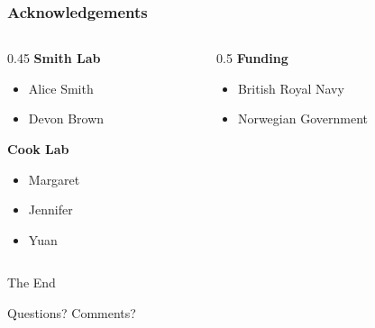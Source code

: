 \documentclass[
	11pt, %
	aspectratio=169, %
]{beamer}
\begin{document}

\begin{frame}
	\frametitle{Acknowledgements}
	
	\begin{columns}[t] %
		\begin{column}{0.45\textwidth} %
			\textbf{Smith Lab}
			\begin{itemize}
				\item Alice Smith
				\item Devon Brown
			\end{itemize}
			\textbf{Cook Lab}
			\begin{itemize}
				\item Margaret
				\item Jennifer
				\item Yuan
			\end{itemize}
		\end{column}		
		\begin{column}{0.5\textwidth} %
			\textbf{Funding}
			\begin{itemize}
				\item British Royal Navy
				\item Norwegian Government
			\end{itemize}
		\end{column}
	\end{columns}
\end{frame}


\begin{frame}[plain] %
	\begin{center}
		{\Huge The End}
		
		\bigskip\bigskip %
		
		{\LARGE Questions? Comments?}
	\end{center}
\end{frame}

\end{document}
